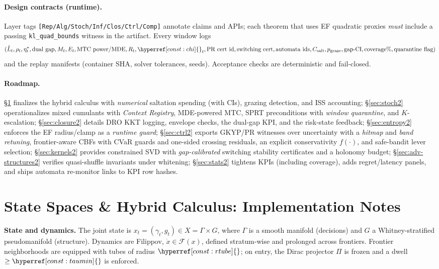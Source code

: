 \documentclass[10pt]{article}
\newcommand{\constref}[1]{\hyperref[const:#1]{\ensuremath{\csname constsym#1\endcsname}}}
\begin{document}
\paragraph{Design contracts (runtime).}
Layer tags \texttt{[Rep/Alg/Stoch/Inf/Clos/Ctrl/Comp]} annotate claims and APIs; each theorem that uses EF quadratic proxies \emph{must} include a passing \texttt{kl\_quad\_bounds} witness in the artifact. Every window logs
\[
(\hat L_t,\rho_t,\eta_t^\star,\text{dual gap},M_t,E_t,\text{MTC power/MDE},R_t,\constref{chi}_t,\text{PR cert id},\text{switching cert},\text{automata ids},C_{\mathrm{salt}},p_{\mathrm{graze}},\text{gap-CI},\text{coverage\%},\text{quarantine flag})
\]
and the replay manifests (container SHA, solver tolerances, seeds). Acceptance checks are deterministic and fail-closed.

\paragraph{Roadmap.}
\S\ref{sec:calc2} finalizes the hybrid calculus with \emph{numerical} saltation spending (with CIs), grazing detection, and ISS accounting; \S\ref{sec:stoch2} operationalizes mixed cumulants with \emph{Context Registry}, MDE-powered MTC, SPRT preconditions with \emph{window quarantine}, and $K$-escalation; \S\ref{sec:closure2} details DRO KKT logging, envelope checks, the dual-gap KPI, and the risk-state feedback; \S\ref{sec:entropy2} enforces the EF radius/clamp as a \emph{runtime guard}; \S\ref{sec:ctrl2} exports GKYP/PR witnesses over uncertainty with a \emph{hitmap} and \emph{band retuning}, frontier-aware CBFs with CVaR guards and one-sided crossing residuals, an explicit conservativity $f(\cdot)$, and safe-bandit lever selection; \S\ref{sec:kernels2} provides constrained SVD with \emph{gap-calibrated} switching stability certificates and a holonomy budget; \S\ref{sec:adv-structures2} verifies quasi-shuffle invariants under whitening; \S\ref{sec:stats2} tightens KPIs (including coverage), adds regret/latency panels, and ships automata re-monitor links to KPI row hashes.

\section{State Spaces \& Hybrid Calculus: Implementation Notes}\label{sec:calc2}

\noindent\textbf{State and dynamics.}
The joint state is $x_t=(\gamma_t,g_t)\in X=\Gamma\times G$, where $\Gamma$ is a smooth manifold (decisions) and $G$ a Whitney-stratified pseudomanifold (structure).
Dynamics are Filippov, $\dot x\in \mathcal F(x)$, defined stratum-wise and prolonged across frontiers.
Frontier neighborhoods are equipped with tubes of radius $\constref{rtube}$; on entry, the Dirac projector $\Pi$ is frozen and a dwell $\ge \constref{taumin}$ is enforced.
\end{document}
